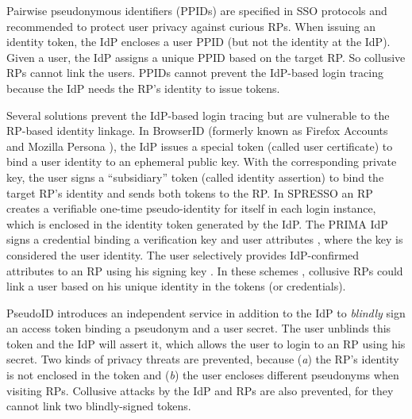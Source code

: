 Pairwise pseudonymous identifiers (PPIDs) are specified in SSO protocols \cite{OpenIDConnect, SAMLIdentifier} and recommended \cite{NIST2017draft}
to protect user privacy against curious RPs.
When issuing an identity token,
        the IdP encloses a user PPID (but not the identity at the IdP).
Given a user, the IdP assigns a unique PPID based on the target RP.
So collusive RPs cannot link the users.
PPIDs cannot prevent the IdP-based login tracing because the IdP needs the RP's identity to issue tokens.



Several solutions prevent the IdP-based login tracing but are vulnerable to the RP-based identity linkage.
In BrowserID \cite{BrowserID} (formerly known as Firefox Accounts \cite{FirefoxAccount} and Mozilla Persona \cite{persona}), the IdP %
issues a special token (called user certificate) to bind a user identity to an ephemeral public key. With the corresponding private key, the user signs a ``subsidiary'' token (called identity assertion) to bind the target RP's identity and sends both tokens to the RP.
In SPRESSO \cite{SPRESSO} an RP creates a verifiable one-time pseudo-identity for itself in each login instance, which is enclosed in the identity token generated by the IdP. %
The PRIMA IdP signs a credential
 binding a verification key and user attributes \cite{prima}, where the key is considered the user identity.
The user selectively provides IdP-confirmed attributes to an RP using his signing key \cite{Oblivion}.
In these schemes \cite{BrowserID,SPRESSO,prima}, collusive RPs could link a user based on his unique identity in the tokens (or credentials).


PseudoID \cite{PseudoID} introduces an independent service in addition to the IdP to \emph{blindly} sign an access token binding a pseudonym and a user secret.
The user unblinds this token and the IdP will assert it,
    which allows the user to login to an RP using his secret.
Two kinds of privacy threats are prevented, because (\emph{a}) the RP's identity is not enclosed in the token
    and (\emph{b}) the user encloses different pseudonyms when visiting RPs.
Collusive attacks by the IdP and RPs are also prevented,
    for they cannot link two blindly-signed tokens.



